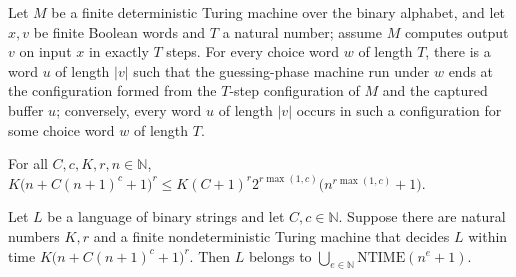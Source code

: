 \begin{lemma}
\label{Complexity.cont_guess_coverage}
\leanok
{}
Let $M$ be a finite deterministic Turing machine over the binary alphabet, and let $x,v$
be finite Boolean words and $T$ a natural number; assume $M$ computes output $v$ on
input $x$ in exactly $T$ steps. For every choice word $w$ of length $T$, there is a word
$u$ of length $|v|$ such that the guessing-phase machine run under $w$ ends at the
configuration formed from the $T$-step configuration of $M$ and the captured buffer $u$;
conversely, every word $u$ of length $|v|$ occurs in such a configuration for some
choice word $w$ of length $T$.
\end{lemma}

\begin{lemma}
\label{Complexity.cont_guess_time_bound}
\leanok
{}
For all $C,c,K,r,n\in\mathbb{N}$, $K\bigl(n+C(n+1)^c+1\bigr)^r\leq
K(C+1)^r2^{r\max(1,c)}\bigl(n^{r\max(1,c)}+1\bigr)$.
\end{lemma}

\begin{lemma}
\label{Complexity.cont_guess_normalize}
\leanok
{}
Let $L$ be a language of binary strings and let $C,c\in\mathbb{N}$. Suppose there are
natural numbers $K,r$ and a finite nondeterministic Turing machine that decides $L$
within time $K\bigl(n+C(n+1)^c+1\bigr)^r$. Then $L$ belongs to
$\bigcup_{e\in\mathbb{N}}\mathrm{NTIME}(n^e+1)$.
\end{lemma}

